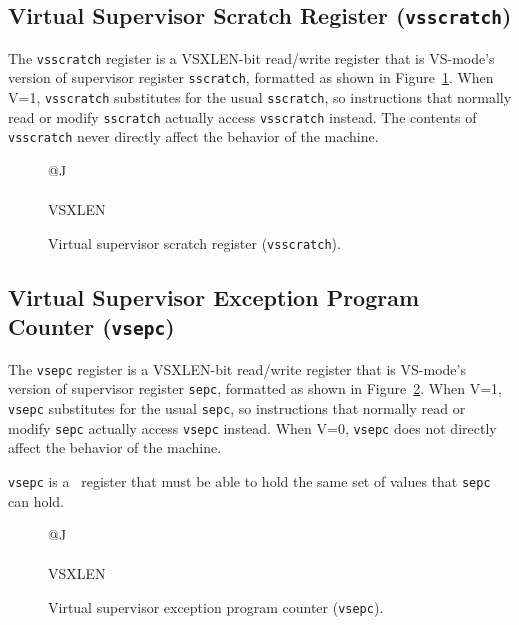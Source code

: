 \subsection{Virtual Supervisor Scratch Register ({\tt vsscratch})}

The {\tt vsscratch} register is a VSXLEN-bit read/write register that is
VS-mode's version of supervisor register {\tt sscratch}, formatted as
shown in Figure~\ref{vsscratchreg}.
When V=1, {\tt vsscratch} substitutes for the usual {\tt sscratch}, so
instructions that normally read or modify {\tt sscratch} actually access
{\tt vsscratch} instead.
The contents of {\tt vsscratch} never directly affect the behavior of
the machine.

\begin{figure}[h!]
{\footnotesize
\begin{center}
\begin{tabular}{@{}J}
 \\
\hline
{} \\
\hline
VSXLEN \\
\end{tabular}
\end{center}
}
\vspace{-0.1in}
\caption{Virtual supervisor scratch register ({\tt vsscratch}).}
\label{vsscratchreg}
\end{figure}

\subsection{Virtual Supervisor Exception Program Counter ({\tt vsepc})}

The {\tt vsepc} register is a VSXLEN-bit read/write register that is
VS-mode's version of supervisor register {\tt sepc}, formatted as shown
in Figure~\ref{vsepcreg}.
When V=1, {\tt vsepc} substitutes for the usual {\tt sepc}, so
instructions that normally read or modify {\tt sepc} actually access
{\tt vsepc} instead.
When V=0, {\tt vsepc} does not directly affect the behavior of the
machine.

{\tt vsepc} is a \warl\ register that must be able to hold the same set of
values that {\tt sepc} can hold.

\begin{figure}[h!]
{\footnotesize
\begin{center}
\begin{tabular}{@{}J}
 \\
\hline
{} \\
\hline
VSXLEN \\
\end{tabular}
\end{center}
}
\vspace{-0.1in}
\caption{Virtual supervisor exception program counter ({\tt vsepc}).}
\label{vsepcreg}
\end{figure}

